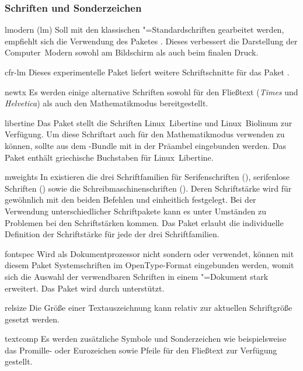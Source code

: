 \subsubsection{Schriften und Sonderzeichen}
\begin{packages}
\item[lmodern](lm)
  Soll mit den klassischen "=Standardschriften gearbeitet werden, 
  empfiehlt sich die Verwendung des Paketes . Dieses 
  verbessert die Darstellung der Computer~Modern sowohl am Bildschirm als auch 
  beim finalen Druck.
\item[cfr-lm]
  Dieses experimentelle Paket liefert weitere Schriftschnitte für das Paket 
  .
\item[newtx]
  Es werden einige alternative Schriften sowohl für den Fließtext 
  (\textit{Times} und \textit{Helvetica}) als auch den Mathematikmodus 
  bereitgestellt.
\item[libertine]
  Das Paket stellt die Schriften Linux~Libertine und Linux~Biolinum zur 
  Verfügung. Um diese Schriftart auch für den Mathematikmodus verwenden zu 
  können, sollte  aus dem -Bundle mit     
   in der 
  Präambel eingebunden werden. Das Paket  enthält griechische 
  Buchstaben für Linux~Libertine.
\item[mweights]
  In  existieren die drei Schriftfamilien für Serifenschriften 
  (), serifenlose Schriften () sowie die 
  Schreibmaschinenschriften (). Deren Schriftstärke wird für 
  gewöhnlich mit den beiden Befehlen  und  
  einheitlich festgelegt. Bei der Verwendung unterschiedlicher Schriftpakete 
  kann es unter Umständen zu Problemen bei den Schriftstärken kommen. Das Paket 
   erlaubt die individuelle Definition der Schriftstärke für 
  jede der drei Schriftfamilien.
\item[fontspec]
  Wird als Dokumentprozessor nicht  sondern  
  oder  verwendet, können mit diesem Paket Systemschriften im 
  OpenType-Format eingebunden werden, womit sich die Auswahl der verwendbaren 
  Schriften in einem "=Dokument stark erweitert. Das Paket wird 
  durch \TUDScript unterstützt.
\item[relsize]
  Die Größe einer Textauszeichnung kann relativ zur aktuellen Schriftgröße 
  gesetzt werden.
\item[textcomp]
  Es werden zusätzliche Symbole und Sonderzeichen wie beispielsweise das 
  Promille- oder Eurozeichen sowie Pfeile für den Fließtext zur Verfügung 
  gestellt.
\end{packages}
